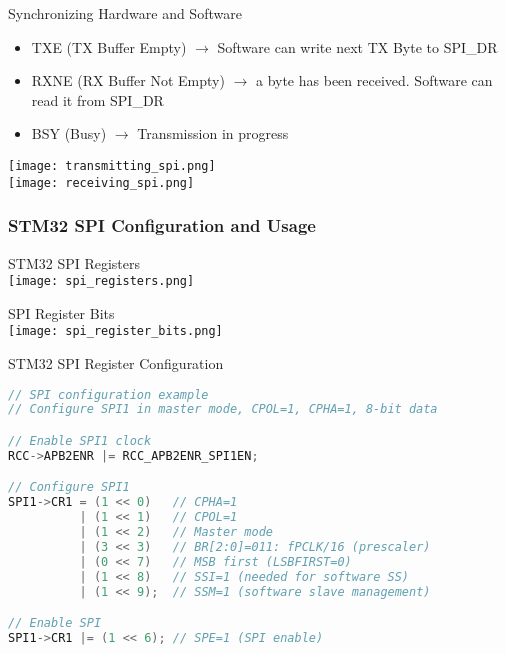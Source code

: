 \begin{corollary}{Synchronizing Hardware and Software}
    \begin{itemize}
        \item TXE (TX Buffer Empty) $\rightarrow$ Software can write next TX Byte to SPI\_DR
        \item RXNE (RX Buffer Not Empty) $\rightarrow$ a byte has been received. Software can read it from SPI\_DR
        \item BSY (Busy) $\rightarrow$ Transmission in progress
    \end{itemize}
    \texttt{[image: transmitting\_spi.png]}\\
    \texttt{[image: receiving\_spi.png]}
\end{corollary}



\subsubsection{STM32 SPI Configuration and Usage}

\begin{definition}{STM32 SPI Registers}\\
    \texttt{[image: spi\_registers.png]}
\end{definition}

\begin{concept}{SPI Register Bits}\\
    \texttt{[image: spi\_register\_bits.png]}
\end{concept}

\begin{code}{STM32 SPI Register Configuration}
\begin{lstlisting}[language=C, style=basesmol]
// SPI configuration example
// Configure SPI1 in master mode, CPOL=1, CPHA=1, 8-bit data

// Enable SPI1 clock
RCC->APB2ENR |= RCC_APB2ENR_SPI1EN;

// Configure SPI1
SPI1->CR1 = (1 << 0)   // CPHA=1
          | (1 << 1)   // CPOL=1
          | (1 << 2)   // Master mode
          | (3 << 3)   // BR[2:0]=011: fPCLK/16 (prescaler)
          | (0 << 7)   // MSB first (LSBFIRST=0)
          | (1 << 8)   // SSI=1 (needed for software SS)
          | (1 << 9);  // SSM=1 (software slave management)

// Enable SPI
SPI1->CR1 |= (1 << 6); // SPE=1 (SPI enable)
\end{lstlisting}
\end{code}

